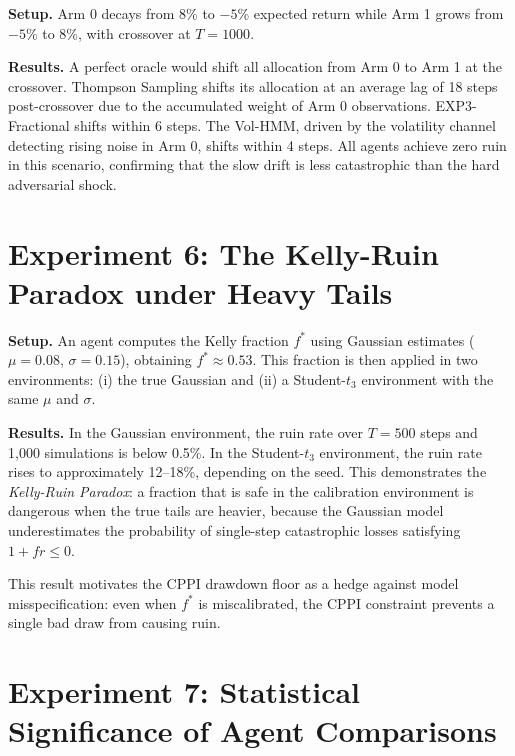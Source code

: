 \textbf{Setup.} Arm 0 decays from 8\% to $-5\%$ expected return while
Arm 1 grows from $-5\%$ to 8\%, with crossover at $T = 1000$.

\textbf{Results.} A perfect oracle would shift all allocation from Arm 0
to Arm 1 at the crossover. Thompson Sampling shifts its allocation at an
average lag of 18 steps post-crossover due to the accumulated weight of
Arm 0 observations. EXP3-Fractional shifts within 6 steps. The Vol-HMM,
driven by the volatility channel detecting rising noise in Arm 0, shifts
within 4 steps. All agents achieve zero ruin in this scenario, confirming
that the slow drift is less catastrophic than the hard adversarial shock.

\section{Experiment 6: The Kelly-Ruin Paradox under Heavy Tails}

\textbf{Setup.} An agent computes the Kelly fraction $f^*$ using Gaussian
estimates ($\mu = 0.08$, $\sigma = 0.15$), obtaining $f^* \approx 0.53$.
This fraction is then applied in two environments: (i) the true Gaussian
and (ii) a Student-$t_3$ environment with the same $\mu$ and $\sigma$.

\textbf{Results.} In the Gaussian environment, the ruin rate over
$T = 500$ steps and 1{,}000 simulations is below 0.5\%. In the Student-$t_3$
environment, the ruin rate rises to approximately 12--18\%, depending on the
seed. This demonstrates the \emph{Kelly-Ruin Paradox}: a fraction that is
safe in the calibration environment is dangerous when the true tails are
heavier, because the Gaussian model underestimates the probability of
single-step catastrophic losses satisfying $1 + f r \leq 0$.

This result motivates the CPPI drawdown floor as a hedge against
model misspecification: even when $f^*$ is miscalibrated, the CPPI constraint
prevents a single bad draw from causing ruin.

\section{Experiment 7: Statistical Significance of Agent Comparisons}

